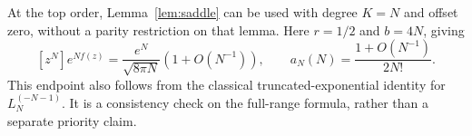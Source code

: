 At the top order, Lemma~\ref{lem:saddle} can be used with degree $K=N$ and offset zero, without a parity restriction on that lemma. Here $r=1/2$ and $b=4N$, giving
\[
[z^N]e^{Nf(z)}=\frac{e^N}{\sqrt{8\pi N}}(1+O(N^{-1})),\qquad
a_N(N)=\frac{1+O(N^{-1})}{2N!}.
\]
This endpoint also follows from the classical truncated-exponential identity for $L_N^{(-N-1)}$. It is a consistency check on the full-range formula, rather than a separate priority claim.
